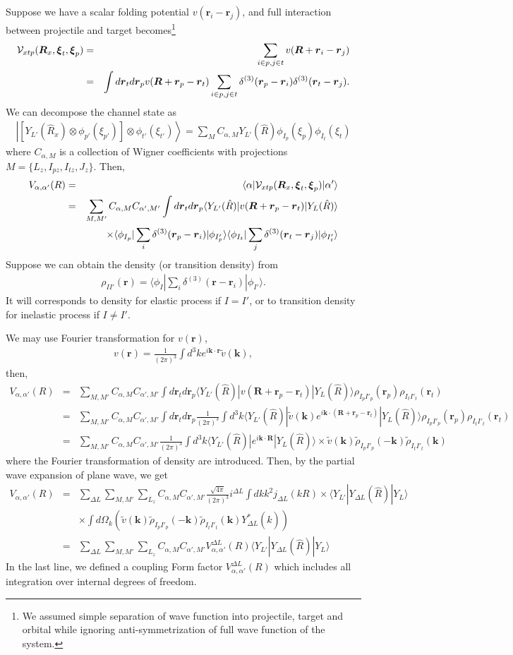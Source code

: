 \documentclass[11pt]{book}
\def\bm{\boldsymbol}
\def\vk{{\bm k}}
\def\vr{{\bm r}}
\def\vR{{\bm R}}
\def\la{\langle}
\def\ra{\rangle}
\newcommand{\bea}{\begin{eqnarray}}
\newcommand{\eea}{\end{eqnarray}}
\newcommand{\no}{\nonumber \\}
\begin{document}
Suppose we have a scalar folding potential $v(\vr_i-\vr_j)$, and full interaction between
projectile and target becomes\footnote{We assumed simple separation of wave function 
	into projectile, target and orbital while ignoring anti-symmetrization of full wave function
of the system.
} 
\bea 
{\cal V}_{xtp}({\bm R}_x,{\bm \xi}_t,{\bm \xi}_p)&=&\sum_{i\in p, j\in t} v({\bm R}+\vr_i-\vr_j) \no 
 &=& \int d{\bm r}_t d{\bm r}_p   v({\bm R}+\vr_p-\vr_t) 
      \sum_{i\in p, j\in t} \delta^{(3)}(\vr_p-\vr_i)\delta^{(3)}(\vr_t-\vr_j)     .
\eea 
We can decompose the channel state as 
\bea 
\left| [Y_{L'}(\hat{R}_{x})\otimes \phi_{p'}(\xi_{p'})]\otimes \phi_{t'}(\xi_{t'})\right\ra
= \sum_{M} C_{\alpha,M} Y_{L'}(\hat{R}) \phi_{I_p}(\xi_p)\phi_{I_t}(\xi_t)
\eea 
where $C_{\alpha,M}$ is a collection of Wigner coefficients with projections $M=\{L_z,I_{pz},I_{tz}, J_z\}$.
Then,
\bea 
V_{\alpha,\alpha'}(R)&=& \la \alpha| {\cal V}_{xtp}({\bm R}_x,{\bm \xi}_t,{\bm \xi}_p)|\alpha'\ra \no 
 &=& \sum_{M,M'} C_{\alpha,M}C_{\alpha',M'} 
  \int d{\bm r}_t d{\bm r}_p   \la Y_{L'}(\hat{R})| v({\bm R}+\vr_p-\vr_t) |Y_L(\hat{R})\ra
  \no & &  \quad \times  
   \la \phi_{I_p}|\sum_{i}  \delta^{(3)}(\vr_p-\vr_i) |\phi_{I'_p}\ra 
   \la \phi_{I_t}|\sum_{j}  \delta^{(3)}(\vr_t-\vr_j) |\phi_{I'_t}\ra    
\eea 
Suppose we can obtain the density (or transition density) from 
\bea 
\rho_{I I'}(\vr) =\la \phi_{I}|\sum_{i}  \delta^{(3)}(\vr-\vr_i) |\phi_{I'}\ra.
\eea  
It will corresponds to density for elastic process if $I=I'$, or  
to transition density for inelastic process if $I\neq I'$.

We may use Fourier transformation for $v(\vr)$,
\bea 
v(\vr)=\frac{1}{(2\pi)^{3}}\int d^3 k e^{i\vk\cdot \vr} \tilde{v}(\vk),
\eea 
then,
\bea 
V_{\alpha,\alpha'}(R)&=&\sum_{M,M'} C_{\alpha,M}C_{\alpha',M'} 
   \int d{\bm r}_t d{\bm r}_p \la Y_{L'}(\hat{R})| v({\bm R}+\vr_p-\vr_t) |Y_L(\hat{R})\ra
   \rho_{I_p I'_p}(\vr_p)\rho_{I_t I'_t}(\vr_t) \no 
   &=& \sum_{M,M'} C_{\alpha,M}C_{\alpha',M'} \int d{\bm r}_t d{\bm r}_p
    \frac{1}{(2\pi)^{3}}\int d^3 k \la Y_{L'}(\hat{R})| \tilde{v}(\vk) e^{i\vk\cdot(\vR+\vr_p-\vr_t) } |Y_L(\hat{R})\ra \rho_{I_p I'_p}(\vr_p)\rho_{I_t I'_t}(\vr_t) \no 
   &=&  \sum_{M,M'} C_{\alpha,M}C_{\alpha',M'}\frac{1}{(2\pi)^{3}}
   \int d^3 k \la Y_{L'}(\hat{R})|  e^{i\vk\cdot \vR } |Y_L(\hat{R})\ra \times 
   \tilde{v}(\vk) \tilde{\rho}_{I_p I'_p}(-\vk)\tilde{\rho}_{I_t I'_t}(\vk)
\eea 
where the Fourier transformation of density are introduced. 
Then, by the partial wave expansion of plane wave, we get 
\bea 
V_{\alpha,\alpha'}(R)&=& \sum_{\Delta L} \sum_{M,M'}\sum_{L_z}
  C_{\alpha,M}C_{\alpha',M'}\frac{\sqrt{4\pi}}{(2\pi)^{3}} i^{\Delta L}
  \int d k k^2 j_{\Delta L}(k R) \times 
  \la Y_{L'}|  Y_{\Delta L}(\hat{R}) |Y_L\ra 
  \no & &  \times \int d\Omega_{k} \left( \tilde{v}(\vk) \tilde{\rho}_{I_p I'_p}(-\vk)\tilde{\rho}_{I_t I'_t}(\vk) Y_{\Delta L}^*(\hat{k}) \right) \no 
  &=& \sum_{\Delta L} \sum_{M,M'}\sum_{L_z} 
    C_{\alpha,M}C_{\alpha',M'} V_{\alpha,\alpha'}^{\Delta L}(R) \la Y_{L'}|  Y_{\Delta L}(\hat{R}) |Y_L\ra
\eea 
In the last line, we defined a coupling Form factor  $V_{\alpha,\alpha'}^{\Delta L}(R)$
which includes all integration over internal degrees of freedom. 
\end{document}
